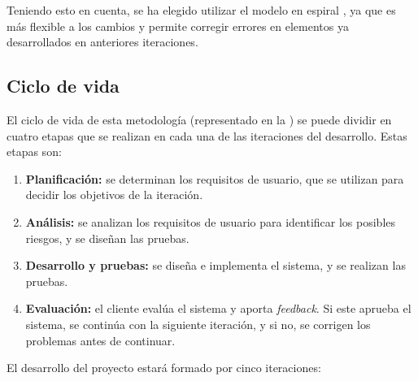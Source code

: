 Teniendo esto en cuenta, se ha elegido utilizar el modelo en espiral
\parencite{spiral-model}, ya que es más flexible a los cambios y permite
corregir errores en elementos ya desarrollados en anteriores iteraciones.

\subsection{Ciclo de vida}\label{subsec:life-cycle}

El ciclo de vida de esta metodología (representado en la
) se puede dividir en cuatro etapas que se realizan en
cada una de las iteraciones del desarrollo. Estas etapas son:

\begin{enumerate}
    \item \textbf{Planificación:} se determinan los requisitos de usuario, que
    se utilizan para decidir los objetivos de la iteración.
    \item \textbf{Análisis:} se analizan los requisitos de usuario para
    identificar los posibles riesgos, y se diseñan las pruebas.
    \item \textbf{Desarrollo y pruebas:} se diseña e implementa el sistema, y se
    realizan las pruebas.
    \item \textbf{Evaluación:} el cliente evalúa el sistema y aporta
    \textit{feedback}. Si este aprueba el sistema, se continúa con la siguiente
    iteración, y si no, se corrigen los problemas antes de continuar.
\end{enumerate}


\noindent
El desarrollo del proyecto estará formado por cinco iteraciones:

